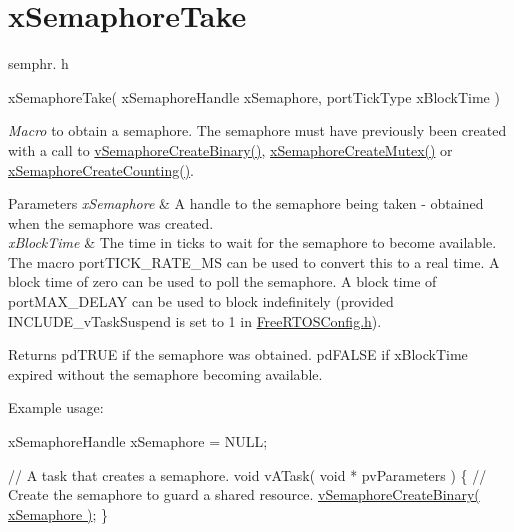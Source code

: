 \hypertarget{group__xSemaphoreTake}{}\section{x\+Semaphore\+Take}
\label{group__xSemaphoreTake}
semphr. h 
\begin{DoxyPre}xSemaphoreTake( 
                    xSemaphoreHandle xSemaphore, 
                    portTickType xBlockTime 
                )\end{DoxyPre}


{\itshape Macro} to obtain a semaphore. The semaphore must have previously been created with a call to \hyperlink{semphr_8h_ae10bffadd26fbd5bcce76bf33a83ef30}{v\+Semaphore\+Create\+Binary()}, \hyperlink{semphr_8h_aa6a00aa9b91a9e5b3ebe4ae1c3f115c6}{x\+Semaphore\+Create\+Mutex()} or \hyperlink{semphr_8h_a7764616a918a46115403569a88148ad4}{x\+Semaphore\+Create\+Counting()}.


\begin{DoxyParams}{Parameters}
{\em x\+Semaphore} & A handle to the semaphore being taken -\/ obtained when the semaphore was created.\\
\hline
{\em x\+Block\+Time} & The time in ticks to wait for the semaphore to become available. The macro port\+T\+I\+C\+K\+\_\+\+R\+A\+T\+E\+\_\+\+MS can be used to convert this to a real time. A block time of zero can be used to poll the semaphore. A block time of port\+M\+A\+X\+\_\+\+D\+E\+L\+AY can be used to block indefinitely (provided I\+N\+C\+L\+U\+D\+E\+\_\+v\+Task\+Suspend is set to 1 in \hyperlink{FreeRTOSConfig_8h}{Free\+R\+T\+O\+S\+Config.\+h}).\\
\hline
\end{DoxyParams}
\begin{DoxyReturn}{Returns}
pd\+T\+R\+UE if the semaphore was obtained. pd\+F\+A\+L\+SE if x\+Block\+Time expired without the semaphore becoming available.
\end{DoxyReturn}
Example usage\+: 
\begin{DoxyPre}
xSemaphoreHandle xSemaphore = NULL;\end{DoxyPre}



\begin{DoxyPre}// A task that creates a semaphore.
void vATask( void * pvParameters )
\{
   // Create the semaphore to guard a shared resource.
   \hyperlink{semphr_8h_ae10bffadd26fbd5bcce76bf33a83ef30}{vSemaphoreCreateBinary( xSemaphore )};
\}\end{DoxyPre}



